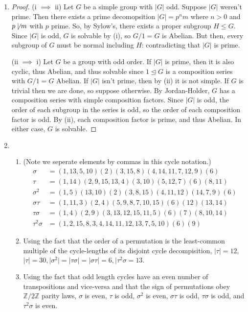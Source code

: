 \documentclass[11pt, letterpaper]{article}
\begin{document}
\thispagestyle{firststyle}


\begin{enumerate}
  \item \begin{proof}
    (i $\implies$ ii) Let $G$ be a simple group with $\vert G \vert$ odd. Suppose $\vert G \vert$ weren't prime. Then there exists a prime decomopsition $\vert G \vert = p^nm$ where $n > 0$ and $p \not\mid m$ with $p$ prime. So, by Sylow's, there exists a proper subgroup $H \leq G$. Since $\vert G \vert$ is odd, $G$ is solvable by (i), so $G/1 = G$ is Abelian. But then, every subgroup of $G$ must be normal including $H$: contradicting that $\vert G \vert$ is prime.

    (ii $\implies$ i) Let $G$ be a group with odd order. If $\vert G \vert$ is prime, then it is also cyclic, thus Abelian, and thus solvable since $1 \trianglelefteq G$ is a composition series with $G/1 = G$ Abelian. If $\vert G \vert$ isn't prime, then by (ii) it is not simple. If $G$ is trivial then we are done, so suppose otherwise. By Jordan-Holder, $G$ has a composition series with simple composition factors. Since $\vert G \vert$ is odd, the order of each subgroup in the series is odd, so the order of each composition factor is odd. By (ii), each composition factor is prime, and thus Abelian. In either case, $G$ is solvable.
  \end{proof}

  \item \begin{enumerate}
    \item (Note we seperate elements by commas in this cycle notation.) \begin{align*}
      \sigma &= (1,13,5,10)(2)(3,15,8)(4,14,11,7,12,9)(6) \\
      \tau &= (1,14)(2,9,15,13,4)(3,10)(5,12,7)(6)(8,11) \\
      \sigma^2 &= (1,5) (13, 10)(2)(3,8,15)(4,11,12)(14,7,9)(6) \\
      \sigma\tau &= (1,11,3)(2,4)(5,9,8,7,10,15)(6)(12)(13,14) \\
      \tau\sigma &= (1,4)(2,9)(3,13,12,15,11,5)(6)(7)(8,10,14) \\
      \tau^2 \sigma &= (1, 2, 15, 8, 3, 4, 14, 11, 12, 13, 7, 5, 10)(6)(9)
    \end{align*}
    \item Using the fact that the order of a permutation is the least-common multiple of the cycle-lengths of its disjoint cycle decompisition, $\vert \tau \vert = 12$, $\vert \tau \vert = 30, \vert \sigma^2 \vert = \vert \tau\sigma \vert = \vert \sigma\tau \vert = 6, \vert \tau^2 \sigma = 13$.
    \item Using the fact that odd length cycles have an even number of transpositions and vice-versa and that the sign of permutations obey $\mathbb Z/2\mathbb Z$ parity laws, $\sigma$ is even, $\tau$ is odd, $\sigma^2$ is even, $\sigma \tau$ is odd, $\tau \sigma$ is odd, and $\tau^2 \sigma$ is even.
  \end{enumerate}


\end{enumerate}
\end{document}
